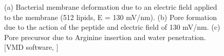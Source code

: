 \begin{figure}[t!]
\centering
\begin{minipage}[b]{0.26\linewidth}
\centering
{}
\end{minipage}
\begin{minipage}[b]{0.4\linewidth}
\centering
{}
\end{minipage}
\begin{minipage}[b]{0.26\linewidth}
\centering
{}
\end{minipage}
\caption[Snapshot from relevant membrane-peptide atomistic simulations]{(a) Bacterial membrane deformation due to an electric field applied to the membrane (512 lipids, E = 130 mV/nm). (b) Pore formation due to the action of the peptide and electric field of 130 mV/nm. (c) Pore precursor due to Arginine insertion and water penetration. [VMD software, \citet{HUMP96}]}
\label{fig:pore_pics}
\end{figure}

